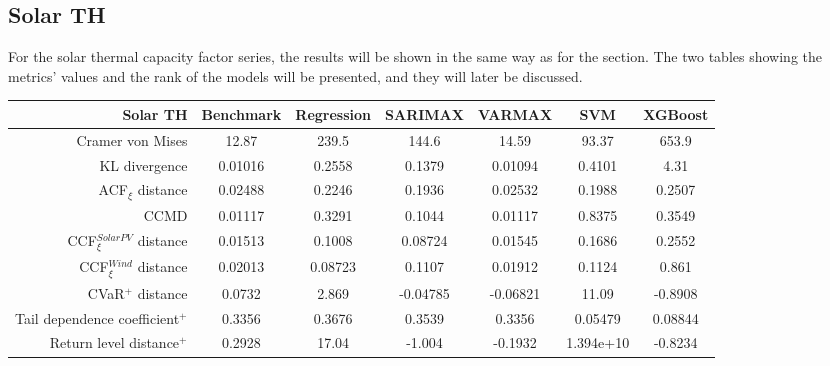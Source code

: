 \subsection{Solar TH}
For the solar thermal capacity factor series, the results will be shown in the same way as for the  section. The two tables showing the metrics' values and the rank of the models will be presented, and they will later be discussed. 


\begin{table}[ht]
    \footnotesize
    \begin{tabular}[l]{r|c|ccc|cc|}
        \toprule
        \textbf{Solar TH} &Benchmark&Regression&SARIMAX&VARMAX&SVM&XGBoost \\ 
        \midrule            
        Cramer von Mises&12.87&239.5&144.6&14.59&93.37&653.9 \\
        KL divergence&0.01016&0.2558&0.1379&0.01094&0.4101&4.31 \\
        ACF$_\xi$ distance&0.02488&0.2246&0.1936&0.02532&0.1988&0.2507 \\
        \midrule
        CCMD&0.01117&0.3291&0.1044&0.01117&0.8375&0.3549 \\
        CCF$_\xi^{Solar PV}$ distance&0.01513&0.1008&0.08724&0.01545&0.1686&0.2552 \\
        CCF$_\xi^{Wind}$ distance&0.02013&0.08723&0.1107&0.01912&0.1124&0.861 \\
        \midrule
        CVaR$^+$ distance&0.0732&2.869&-0.04785&-0.06821&11.09&-0.8908 \\
        Tail dependence coefficient$^+$&0.3356&0.3676&0.3539&0.3356&0.05479&0.08844 \\
        Return level distance$^+$&0.2928&17.04&-1.004&-0.1932&1.394e+10&-0.8234 \\
        \bottomrule
    \end{tabular}
\end{table}
